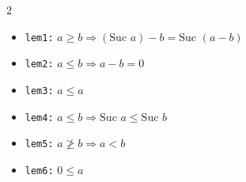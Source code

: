 \documentclass[10pt,a4paper]{article}
\begin{document}
\begin{tcolorbox}[title={Auxiliary Lemmas Used in Proof}]
\begin{multicols}{2}
\begin{itemize}[leftmargin=1.2em, itemsep=2pt]
    \item \texttt{lem1:} $a \ge b \Longrightarrow (\text{Suc } a) - b = \text{Suc } (a - b)$
    \item \texttt{lem2:} $a \le b \Longrightarrow a - b = 0$
    \item \texttt{lem3:} $a \le a$
\end{itemize}
\columnbreak
\begin{itemize}[leftmargin=1.2em, itemsep=2pt]
    \item \texttt{lem4:} $a \le b \Longrightarrow \text{Suc } a \le \text{Suc } b$
    \item \texttt{lem5:} $a \ngeq b \Longrightarrow a < b$
    \item \texttt{lem6:} $0 \le a$
\end{itemize}
\end{multicols}
\end{tcolorbox}
\end{document}

